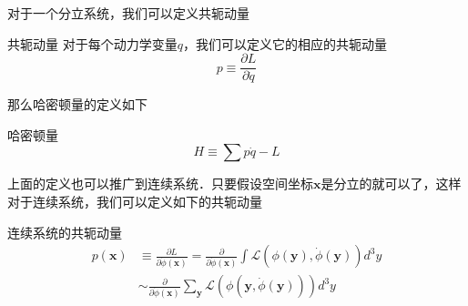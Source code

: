 对于一个分立系统，我们可以定义共轭动量
\begin{definition}{共轭动量}
对于每个动力学变量$q$，我们可以定义它的相应的共轭动量
\begin{equation}
p \equiv \frac{\partial L}{\partial \dot q}
\end{equation}
\end{definition}
那么哈密顿量的定义如下
\begin{definition}{哈密顿量}
\begin{equation}
H \equiv \sum p \dot q - L
\end{equation}
\end{definition}
上面的定义也可以推广到连续系统．只要假设空间坐标$\mathbf x$是分立的就可以了，这样对于连续系统，我们可以定义如下的共轭动量
\begin{definition}{连续系统的共轭动量}
\begin{equation}
\begin{aligned}
p(\mathbf x) & \equiv \frac{\partial L}{\partial \dot \phi(\mathbf x)} = \frac{\partial}{\partial \dot \phi(\mathbf x)} \int \mathcal L(\phi(\mathbf y),\dot \phi(\mathbf y)) d^3 y \\
& \sim \frac{\partial}{\partial \dot \phi(\mathbf x)} \sum_{\mathbf y} \mathcal L(\phi(\mathbf y,\dot \phi(\mathbf y))) d^3 y
\end{aligned}
\end{equation}
\end{definition}





